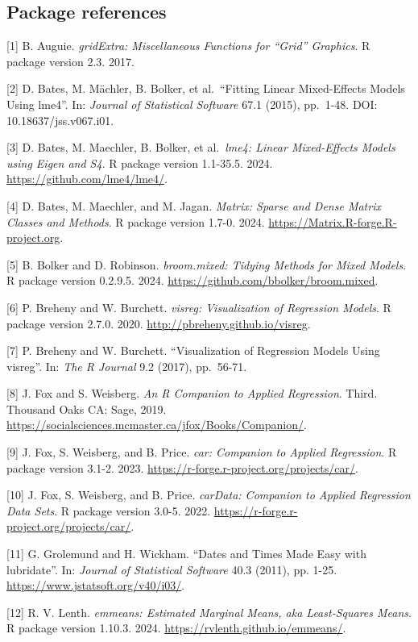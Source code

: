 \documentclass[
  letterpaper,
  DIV=11,
  numbers=noendperiod]{scrreprt}
\begin{document}
\subsection{Package references}\label{package-references-3}

{[}1{]} B. Auguie. \emph{gridExtra: Miscellaneous Functions for ``Grid''
Graphics}. R package version 2.3. 2017.

{[}2{]} D. Bates, M. Mächler, B. Bolker, et al.~``Fitting Linear
Mixed-Effects Models Using lme4''. In: \emph{Journal of Statistical
Software} 67.1 (2015), pp.~1-48. DOI: 10.18637/jss.v067.i01.

{[}3{]} D. Bates, M. Maechler, B. Bolker, et al.~\emph{lme4: Linear
Mixed-Effects Models using Eigen and S4}. R package version 1.1-35.5.
2024. \url{https://github.com/lme4/lme4/}.

{[}4{]} D. Bates, M. Maechler, and M. Jagan. \emph{Matrix: Sparse and
Dense Matrix Classes and Methods}. R package version 1.7-0. 2024.
\url{https://Matrix.R-forge.R-project.org}.

{[}5{]} B. Bolker and D. Robinson. \emph{broom.mixed: Tidying Methods
for Mixed Models}. R package version 0.2.9.5. 2024.
\url{https://github.com/bbolker/broom.mixed}.

{[}6{]} P. Breheny and W. Burchett. \emph{visreg: Visualization of
Regression Models}. R package version 2.7.0. 2020.
\url{http://pbreheny.github.io/visreg}.

{[}7{]} P. Breheny and W. Burchett. ``Visualization of Regression Models
Using visreg''. In: \emph{The R Journal} 9.2 (2017), pp.~56-71.

{[}8{]} J. Fox and S. Weisberg. \emph{An R Companion to Applied
Regression}. Third. Thousand Oaks CA: Sage, 2019.
\url{https://socialsciences.mcmaster.ca/jfox/Books/Companion/}.

{[}9{]} J. Fox, S. Weisberg, and B. Price. \emph{car: Companion to
Applied Regression}. R package version 3.1-2. 2023.
\url{https://r-forge.r-project.org/projects/car/}.

{[}10{]} J. Fox, S. Weisberg, and B. Price. \emph{carData: Companion to
Applied Regression Data Sets}. R package version 3.0-5. 2022.
\url{https://r-forge.r-project.org/projects/car/}.

{[}11{]} G. Grolemund and H. Wickham. ``Dates and Times Made Easy with
lubridate''. In: \emph{Journal of Statistical Software} 40.3 (2011), pp.
1-25. \url{https://www.jstatsoft.org/v40/i03/}.

{[}12{]} R. V. Lenth. \emph{emmeans: Estimated Marginal Means, aka
Least-Squares Means}. R package version 1.10.3. 2024.
\url{https://rvlenth.github.io/emmeans/}.
\end{document}
